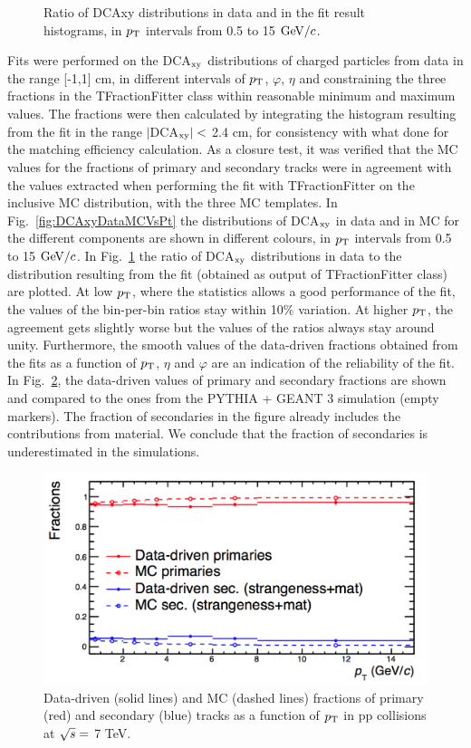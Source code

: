 \begin{enumerate}
\begin{figure}[!hb]
\begin{center}
\caption{Ratio of DCAxy distributions in data and in the fit result histograms, in $p_{\rm T}$ intervals from 0.5 to 15 $\mathrm{GeV}/c$.}
\label{fig:DCAxyRatioDataFitVsPt}
\end{center}
\end{figure}
Fits were performed on the DCA$_{\rm xy}$ distributions of charged particles from data
in the range [-1,1] cm, in different intervals of $p_{\rm T}$, $\varphi$, $\eta$ 
and constraining the three fractions in the TFractionFitter class within reasonable minimum and maximum values.
The fractions were then calculated by integrating the histogram 
resulting from the fit in the range $|$DCA$_{\rm xy}|<$ 2.4 cm, for
consistency with what done for the matching efficiency calculation. 
As a closure test, it was verified that the MC values for the fractions of primary and secondary tracks 
were in agreement with the values extracted when performing the fit with TFractionFitter 
on the inclusive MC distribution, with the three MC templates.  
In Fig.~\ref{fig:DCAxyDataMCVsPt} the distributions of DCA$_{\rm xy}$ 
in data and in MC for the different components are
shown in different colours, in $p_{\rm T}$ intervals from 0.5 to 15 $\mathrm{GeV}/c$. 
In Fig.~\ref{fig:DCAxyRatioDataFitVsPt} the ratio of DCA$_{\rm xy}$ distributions 
in data to the distribution resulting from the fit (obtained as output of TFractionFitter class) are plotted.
At low $p_{\rm T}$, where the statistics allows a good performance of the fit, 
the values of the bin-per-bin ratios stay within 10\% variation. At higher $p_{\rm T}$,
the agreement gets slightly worse but the values of the ratios always stay 
around unity. Furthermore, the smooth values of the data-driven
fractions obtained from the fits as a function of $p_{\rm T}$, $\eta$ and $\varphi$
are an indication of the reliability of the fit.
In Fig.~\ref{fig:Fractions}, the data-driven values of primary and secondary
 fractions are shown and compared to 
 the ones from the PYTHIA + GEANT 3 simulation (empty markers). 
The fraction of secondaries in the figure already includes the contributions 
from material. We conclude that the fraction of secondaries is underestimated in the simulations.
\begin{figure}[!hb]
\begin{center}
\includegraphics[width=.6\textwidth]{FigCap4/MEfractions.png}
\caption{Data-driven (solid lines) and MC (dashed lines) fractions of primary (red) and secondary (blue) tracks as a function of $p_{\rm T}$ in pp collisions at $\sqrt{s} = $ 7 TeV.}
\label{fig:Fractions}
\end{center}
\end{figure}


\end{enumerate}
